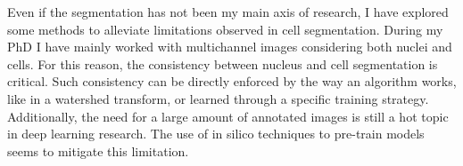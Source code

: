 Even if the segmentation has not been my main axis of research, I have explored some methods to alleviate limitations observed in cell segmentation.
During my PhD I have mainly worked with multichannel images considering both nuclei and cells.
For this reason, the consistency between nucleus and cell segmentation is critical.
Such consistency can be directly enforced by the way an algorithm works, like in a watershed transform, or learned through a specific training strategy.
Additionally, the need for a large amount of annotated images is still a hot topic in deep learning research.
The use of in silico techniques to pre-train models seems to mitigate this limitation.


